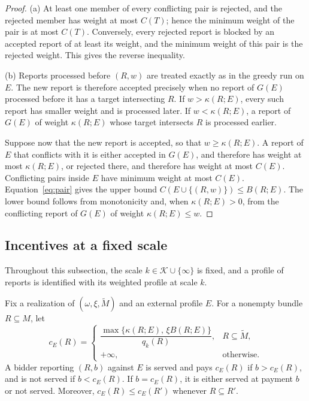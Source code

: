 \documentclass[format=acmsmall, review=false]{acmart}
\begin{document}
\begin{proof}
(a) At least one member of every conflicting pair is rejected,
and the rejected member has weight at most \(C(T)\); hence the
minimum weight of the pair is at most \(C(T)\). Conversely, every
rejected report is blocked by an accepted report of at least its
weight, and the minimum weight of this pair is the rejected
weight. This gives the reverse inequality.

(b) Reports processed before \((R,w)\) are treated exactly as in
the greedy run on \(E\). The new report is therefore accepted
precisely when no report of \(G(E)\) processed before it has a
target intersecting \(R\). If \(w>\kappa(R;E)\), every such
report has smaller weight and is processed later. If
\(w<\kappa(R;E)\), a report of \(G(E)\) of weight
\(\kappa(R;E)\) whose target intersects \(R\) is processed
earlier.

Suppose now that the new report is accepted, so that
\(w\ge\kappa(R;E)\). A report of \(E\) that conflicts with it is
either accepted in \(G(E)\), and therefore has weight at most
\(\kappa(R;E)\), or rejected there, and therefore has weight at
most \(C(E)\). Conflicting pairs inside \(E\) have minimum weight
at most \(C(E)\). Equation~\eqref{eq:pair} gives the upper bound
\(C(E\cup\{(R,w)\})\le B(R;E)\). The lower bound follows from
monotonicity and, when \(\kappa(R;E)>0\), from the conflicting
report of \(G(E)\) of weight \(\kappa(R;E)\le w\).
\end{proof}

\subsection{Incentives at a fixed scale}
\label{sec:rand-scale}

Throughout this subsection, the scale
\(k\in\mathcal K\cup\{\infty\}\) is fixed, and a profile of
reports is identified with its weighted profile at scale \(k\).

\begin{lemma}
\label{lem:threshold}
Fix a realization of \((\omega,\xi,\widetilde M)\) and an
external profile \(E\). For a nonempty bundle \(R\subseteq M\),
let
\[
c_E(R)=
\begin{cases}
\dfrac{\max\{\kappa(R;E),\,\xi B(R;E)\}}{q_k(R)},
&R\subseteq\widetilde M,\\[3mm]
+\infty,&\text{otherwise.}
\end{cases}
\]
A bidder reporting \((R,b)\) against \(E\) is served and pays
\(c_E(R)\) if \(b>c_E(R)\), and is not served if \(b<c_E(R)\).
If \(b=c_E(R)\), it is either served at payment \(b\) or not
served. Moreover, \(c_E(R)\le c_E(R')\) whenever
\(R\subseteq R'\).
\end{lemma}
\end{document}
